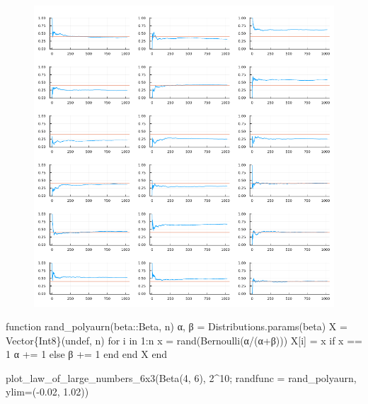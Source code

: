 \documentclass[
  letterpaper,
  DIV=11,
  numbers=noendperiod]{scrartcl}
\newenvironment{Shaded}{\begin{snugshade}}{\end{snugshade}}
\newcommand{\ConstantTok}[1]{\textcolor[rgb]{0.56,0.35,0.01}{#1}}
\newcommand{\ControlFlowTok}[1]{\textcolor[rgb]{0.00,0.23,0.31}{#1}}
\newcommand{\DataTypeTok}[1]{\textcolor[rgb]{0.68,0.00,0.00}{#1}}
\newcommand{\FloatTok}[1]{\textcolor[rgb]{0.68,0.00,0.00}{#1}}
\newcommand{\FunctionTok}[1]{\textcolor[rgb]{0.28,0.35,0.67}{#1}}
\newcommand{\KeywordTok}[1]{\textcolor[rgb]{0.00,0.23,0.31}{#1}}
\newcommand{\NormalTok}[1]{\textcolor[rgb]{0.00,0.23,0.31}{#1}}
\newcommand{\OperatorTok}[1]{\textcolor[rgb]{0.37,0.37,0.37}{#1}}
\begin{document}
\begin{figure}[H]

{\centering \includegraphics{05 Central limit theorem_files/figure-pdf/cell-19-output-1.png}

}

\end{figure}

\begin{Shaded}
\begin{Highlighting}[]
\KeywordTok{function} \FunctionTok{rand\_polyaurn}\NormalTok{(beta}\OperatorTok{::}\DataTypeTok{Beta}\NormalTok{, n)}
\NormalTok{    α, β }\OperatorTok{=}\NormalTok{ Distributions.}\FunctionTok{params}\NormalTok{(beta)}
\NormalTok{    X }\OperatorTok{=} \FunctionTok{Vector}\DataTypeTok{\{Int8\}}\NormalTok{(}\ConstantTok{undef}\NormalTok{, n)}
    \ControlFlowTok{for}\NormalTok{ i }\KeywordTok{in} \FloatTok{1}\OperatorTok{:}\NormalTok{n}
\NormalTok{        x }\OperatorTok{=} \FunctionTok{rand}\NormalTok{(}\FunctionTok{Bernoulli}\NormalTok{(α}\OperatorTok{/}\NormalTok{(α}\OperatorTok{+}\NormalTok{β)))}
\NormalTok{        X[i] }\OperatorTok{=}\NormalTok{ x}
        \ControlFlowTok{if}\NormalTok{ x }\OperatorTok{==} \FloatTok{1}
\NormalTok{            α }\OperatorTok{+=} \FloatTok{1}
        \ControlFlowTok{else}
\NormalTok{            β }\OperatorTok{+=} \FloatTok{1}
        \ControlFlowTok{end}
    \ControlFlowTok{end}
\NormalTok{    X}
\KeywordTok{end}

\FunctionTok{plot\_law\_of\_large\_numbers\_6x3}\NormalTok{(}\FunctionTok{Beta}\NormalTok{(}\FloatTok{4}\NormalTok{, }\FloatTok{6}\NormalTok{), }\FloatTok{2}\OperatorTok{\^{}}\FloatTok{10}\NormalTok{;}
\NormalTok{    randfunc }\OperatorTok{=}\NormalTok{ rand\_polyaurn, ylim}\OperatorTok{=}\NormalTok{(}\OperatorTok{{-}}\FloatTok{0.02}\NormalTok{, }\FloatTok{1.02}\NormalTok{))}
\end{Highlighting}
\end{Shaded}
\end{document}
